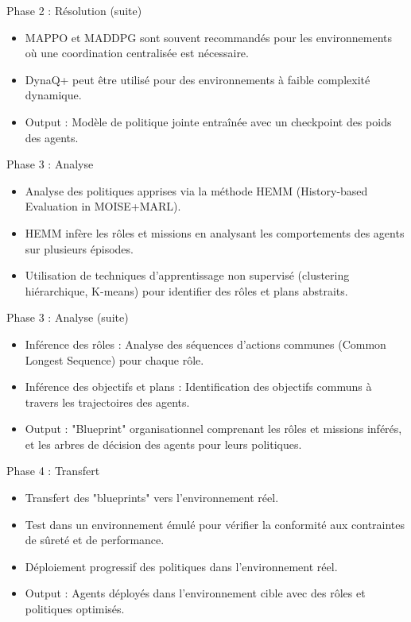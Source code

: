 \documentclass{beamer}
\begin{document}
\begin{frame}{Phase 2 : Résolution (suite)}
    \begin{itemize}
        \item MAPPO et MADDPG sont souvent recommandés pour les environnements où une coordination centralisée est nécessaire.
        \item DynaQ+ peut être utilisé pour des environnements à faible complexité dynamique.
        \item Output : Modèle de politique jointe entraînée avec un checkpoint des poids des agents.
    \end{itemize}
\end{frame}

\begin{frame}{Phase 3 : Analyse}
    \begin{itemize}
        \item Analyse des politiques apprises via la méthode HEMM (History-based Evaluation in MOISE+MARL).
        \item HEMM infère les rôles et missions en analysant les comportements des agents sur plusieurs épisodes.
        \item Utilisation de techniques d'apprentissage non supervisé (clustering hiérarchique, K-means) pour identifier des rôles et plans abstraits.
    \end{itemize}
\end{frame}

\begin{frame}{Phase 3 : Analyse (suite)}
    \begin{itemize}
        \item Inférence des rôles : Analyse des séquences d'actions communes (Common Longest Sequence) pour chaque rôle.
        \item Inférence des objectifs et plans : Identification des objectifs communs à travers les trajectoires des agents.
        \item Output : "Blueprint" organisationnel comprenant les rôles et missions inférés, et les arbres de décision des agents pour leurs politiques.
    \end{itemize}
\end{frame}

\begin{frame}{Phase 4 : Transfert}
    \begin{itemize}
        \item Transfert des "blueprints" vers l'environnement réel.
        \item Test dans un environnement émulé pour vérifier la conformité aux contraintes de sûreté et de performance.
        \item Déploiement progressif des politiques dans l'environnement réel.
        \item Output : Agents déployés dans l'environnement cible avec des rôles et politiques optimisés.
    \end{itemize}
\end{frame}
\end{document}
